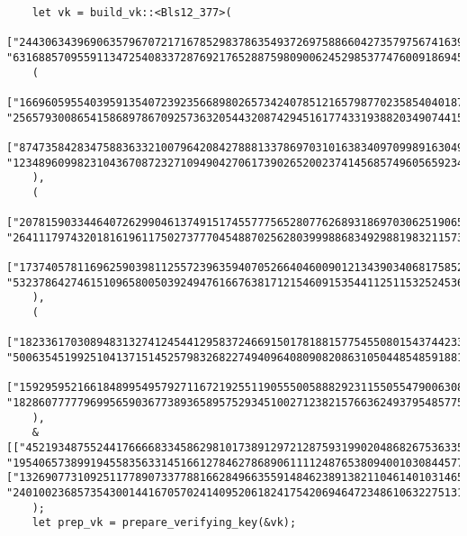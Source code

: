 \documentclass{article}
\begin{document}
\begin{lstlisting}
    let vk = build_vk::<Bls12_377>(
    ["244306343969063579670721716785298378635493726975886604273579756741639953229415532528173059841495385161051909109889", "63168857095591134725408337287692176528875980900624529853774760091869452188562350014800651918572654790783920028544"],
    (
    ["166960595540395913540723923566898026573424078512165798770235854040187289225192916010951416820805112564604857674759", "256579300865415868978670925736320544320874294516177433193882034907441551828751116120797786447763257652992433074246"],
    ["87473584283475883633210079642084278881337869703101638340970998916304987007252265651123549659939971414867340710413", "123489609982310436708723271094904270617390265200237414568574960565923435716212526049371801011721780033997716837207"],
    ),
    (
    ["207815903344640726299046137491517455777565280776268931869703062519065330398931946294820126450478727867816749575328", "26411179743201816196117502737770454887025628039998868349298819832115736570578946577905207881058063637557577233081"],
    ["173740578116962590398112557239635940705266404600901213439034068175852581397457477553437876533246152293969399185346", "53237864274615109658005039249476166763817121546091535441125115325245366998581238918446431741630833736330879409260"],
    ),
    (
    ["182336170308948313274124544129583724669150178188157754550801543744233234403657037451296838109344679861568207613367", "50063545199251041371514525798326822749409640809082086310504485485918817418911777413389911727510843283856035409701"],
    ["159295952166184899549579271167219255119055500588829231155055479006308616522384365458479858992918918801397710916187", "182860777779699565903677389365895752934510027123821576636249379548577596319261062512490971767063470277595543086883"]
    ),
    &[["45219348755244176666833458629810173891297212875931990204868267536335133459926383707224440114114434942676491459498", "19540657389919455835633145166127846278689061111248765380940010308445770554757443738413976319711696645309607631162"], ["132690773109251177890733778816628496635591484623891382110461401031465056699668313488237840261951485844724629886749", "240100236857354300144167057024140952061824175420694647234861063227513152232079560535186470882088794992850790083762"]],
    );
    let prep_vk = prepare_verifying_key(&vk);


\end{lstlisting}
\end{document}
